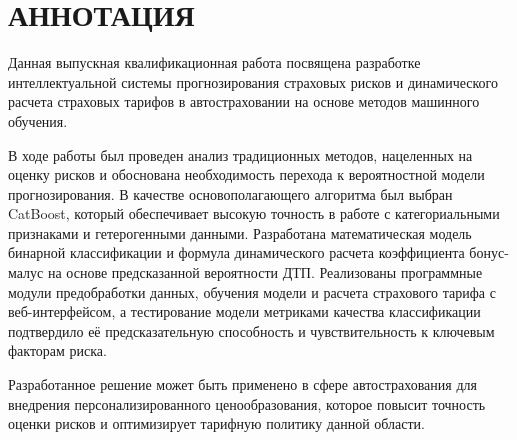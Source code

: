 \section*{АННОТАЦИЯ}

Данная выпускная квалификационная работа посвящена разработке интеллектуальной системы прогнозирования страховых рисков и динамического расчета страховых тарифов в автостраховании на основе методов машинного обучения.

В ходе работы был проведен анализ традиционных методов, нацеленных на оценку рисков и обоснована необходимость перехода к вероятностной модели прогнозирования. В качестве основополагающего алгоритма был выбран CatBoost, который обеспечивает высокую точность в работе с категориальными признаками и гетерогенными данными. Разработана математическая модель бинарной классификации и формула динамического расчета коэффициента бонус-малус на основе предсказанной вероятности ДТП. Реализованы программные модули предобработки данных, обучения модели и расчета страхового тарифа с веб-интерфейсом, а тестирование модели метриками качества классификации подтвердило её предсказательную способность и чувствительность к ключевым факторам риска.

Разработанное решение может быть применено в сфере автострахования для внедрения персонализированного ценообразования, которое повысит точность оценки рисков и оптимизирует тарифную политику данной области.